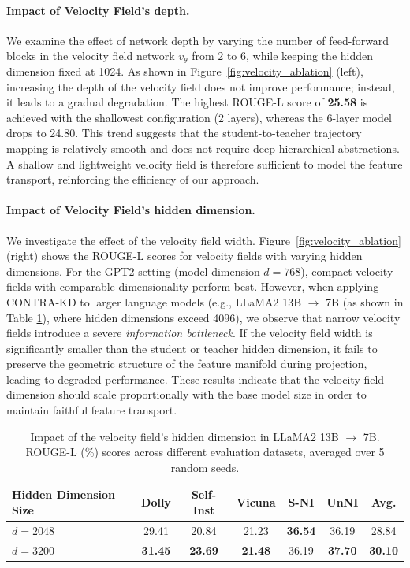 \documentclass{article} %
\theoremstyle{definition}
\theoremstyle{remark}
\begin{document}
\paragraph{Impact of Velocity Field's depth.}
We examine the effect of network depth by varying the number of feed-forward blocks in the velocity field network $v_\theta$ from 2 to 6, while keeping the hidden dimension fixed at 1024. As shown in Figure~\ref{fig:velocity_ablation} (left), increasing the depth of the velocity field does not improve performance; instead, it leads to a gradual degradation. The highest ROUGE-L score of \textbf{25.58} is achieved with the shallowest configuration (2 layers), whereas the 6-layer model drops to 24.80. This trend suggests that the student-to-teacher trajectory mapping is relatively smooth and does not require deep hierarchical abstractions. A shallow and lightweight velocity field is therefore sufficient to model the feature transport, reinforcing the efficiency of our approach.

\paragraph{Impact of Velocity Field's hidden dimension.}
We investigate the effect of the velocity field width. Figure~\ref{fig:velocity_ablation} (right) shows the ROUGE-L scores for velocity fields with varying hidden dimensions. For the GPT2 setting (model dimension $d = 768$), compact velocity fields with comparable dimensionality perform best. However, when applying CONTRA-KD to larger language models (e.g., LLaMA2 13B $\rightarrow$ 7B (as shown in Table \ref{tab:velocity_dim_ablation}), where hidden dimensions exceed 4096), we observe that narrow velocity fields introduce a severe \emph{information bottleneck}. If the velocity field width is significantly smaller than the student or teacher hidden dimension, it fails to preserve the geometric structure of the feature manifold during projection, leading to degraded performance. These results indicate that the velocity field dimension should scale proportionally with the base model size in order to maintain faithful feature transport.

\begin{table}[h]
\caption{Impact of the velocity field's hidden dimension in LLaMA2 13B $\rightarrow$ 7B. ROUGE-L (\%) scores across different evaluation datasets, averaged over 5 random seeds.}
\label{tab:velocity_dim_ablation}
\begin{center}
\begin{small}
\begin{tabular}{lcccccc}
\toprule
Hidden Dimension Size & Dolly & Self-Inst & Vicuna & S-NI & UnNI & Avg. \\
\midrule
$d = 2048$ & 29.41 & 20.84 & 21.23 & \textbf{36.54} & 36.19 & 28.84 \\
$d = 3200$ & \textbf{31.45} & \textbf{23.69} & \textbf{21.48} & 36.19 & \textbf{37.70} & \textbf{30.10} \\
\bottomrule
\end{tabular}
\end{small}
\end{center}
\end{table}
\end{document}
